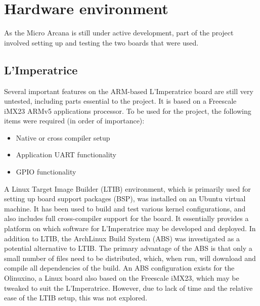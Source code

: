 




\section{Hardware environment} %
\label{sec:hardware_dev_env}
	As the Micro Arcana is still under active development, part of the project involved setting up and testing the two boards that were used.

	\subsection{L'Imperatrice} %
	\label{sub:l_imperatrice_env}
		Several important features on the ARM-based L'Imperatrice board are still very untested, including parts essential to the project.  It is based on a Freescale iMX23 ARMv5 applications processor.  To be used for the project, the following items were required (in order of importance):
		\begin{itemize}
			\item Native or cross compiler setup
			\item Application UART functionality
			\item GPIO functionality  
		\end{itemize}

		A Linux Target Image Builder (LTIB)  environment, which is primarily used for setting up board support packages (BSP), was installed on an Ubuntu virtual machine.  It has been used to build and test various kernel configurations, and also includes full cross-compiler support for the board.  It essentially provides a platform on which software for L'Imperatrice may be developed and deployed.
		In addition to LTIB, the ArchLinux Build System (ABS) was investigated as a potential alternative to LTIB.  The primary advantage of the ABS is that only a small number of files need to be distributed, which, when run, will download and compile all dependencies of the build.  An ABS configuration exists for the Olinuxino, a Linux board also based on the Freescale iMX23, which may be tweaked to suit the L'Imperatrice.  However, due to lack of time and the relative ease of the LTIB setup, this was not explored.

